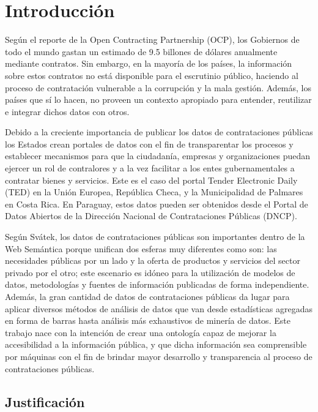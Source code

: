 \chapter{Introducción}
\label{chap:introduccion}
Según el reporte de la Open Contracting Partnership (OCP), los Gobiernos de todo el mundo gastan un estimado de 9.5 billones de dólares anualmente mediante contratos. Sin embargo, en la mayoría de los países, la información sobre estos contratos no está disponible para el escrutinio público, haciendo al proceso de contratación vulnerable a la corrupción y la mala gestión. Además, los países que sí lo hacen, no proveen un contexto apropiado para entender, reutilizar e integrar dichos datos con otros.

Debido a la creciente importancia de publicar los datos de contrataciones públicas  los Estados crean portales de datos con el fin de transparentar los procesos y establecer mecanismos para que la ciudadanía, empresas y organizaciones puedan ejercer un rol de contralores y a la vez facilitar a los entes gubernamentales a contratar bienes y servicios. Este es el caso del portal Tender Electronic Daily (TED) en la Unión Europea, República Checa, y la Municipalidad de Palmares en Costa Rica. En Paraguay, estos datos pueden ser obtenidos desde el Portal de Datos Abiertos de la Dirección Nacional de Contrataciones Públicas (DNCP).

Según Svátek, los datos de contrataciones públicas son importantes dentro de la Web Semántica porque unifican dos esferas muy diferentes como son: las necesidades públicas por un lado y la oferta de productos y servicios del sector privado por el otro; este escenario es idóneo para la utilización de modelos de datos, metodologías y fuentes de información publicadas de forma independiente. Además, la gran cantidad de datos de contrataciones públicas da lugar para aplicar diversos métodos de análisis de datos que van desde estadísticas agregadas en forma de barras hasta análisis más exhaustivos de minería de datos.
Este trabajo nace con la intención de crear una ontología capaz de mejorar la accesibilidad a la información pública, y que dicha información sea comprensible por máquinas con el fin de brindar mayor desarrollo y transparencia al proceso de contrataciones públicas.



\section{Justificación}

